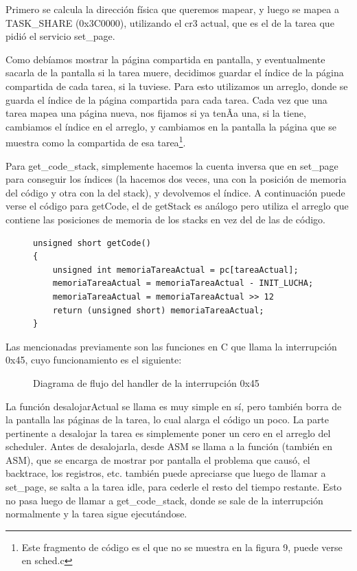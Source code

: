 \documentclass[10pt, a4paper]{article}
\begin{document}
Primero se calcula la dirección física que queremos mapear, y luego se mapea a TASK\_SHARE (0x3C0000), utilizando el cr3 actual, que es el de la tarea que pidió el servicio set\_page.

Como debíamos mostrar la página compartida en pantalla, y eventualmente sacarla de la pantalla si la tarea muere, decidimos guardar el índice de la página compartida de cada tarea, si la tuviese. Para esto utilizamos un arreglo, donde se guarda el índice de la página compartida para cada tarea. Cada vez que una tarea mapea una página nueva, nos fijamos si ya tenÃ­a una, si la tiene, cambiamos el índice en el arreglo, y cambiamos en la pantalla la página que se muestra como la compartida de esa tarea\footnote{Este fragmento de código es el que no se muestra en la figura 9, puede verse en sched.c}.

Para get\_code\_stack, simplemente hacemos la cuenta inversa que en set\_page para conseguir los índices (la hacemos dos veces, una con la posición de memoria del código y otra con la del stack), y devolvemos el índice.
A continuación puede verse el código para getCode, el de getStack es análogo pero utiliza el arreglo que contiene las posiciones de memoria de los stacks en vez del de las de código.
\begin{figure}[!h]
\begin{center}
\begin{verbatim}
unsigned short getCode()
{
	unsigned int memoriaTareaActual = pc[tareaActual];
	memoriaTareaActual = memoriaTareaActual - INIT_LUCHA;
	memoriaTareaActual = memoriaTareaActual >> 12
	return (unsigned short) memoriaTareaActual;
}
\end{verbatim}
\end{center}
\end{figure}

Las mencionadas previamente son las funciones en C que llama la interrupción 0x45, cuyo funcionamiento es el siguiente:

	\begin{figure}[H]
  		\centering
		\caption{Diagrama de flujo del handler de la interrupción 0x45}
		\label{fig:i45}
	\end{figure}
	
La función desalojarActual se llama es muy simple en sí, pero también borra de la pantalla las páginas de la tarea, lo cual alarga el código un poco. La parte pertinente a desalojar la tarea es simplemente poner un cero en el arreglo del scheduler. Antes de desalojarla, desde ASM se llama a la función (también en ASM), que se encarga de mostrar por pantalla el problema que causó, el backtrace, los registros, etc.
también puede apreciarse que luego de llamar a set\_page, se salta a la tarea idle, para cederle el resto del tiempo restante. Esto no pasa luego de llamar a get\_code\_stack, donde se sale de la interrupción normalmente y la tarea sigue ejecutándose.
\end{document}
